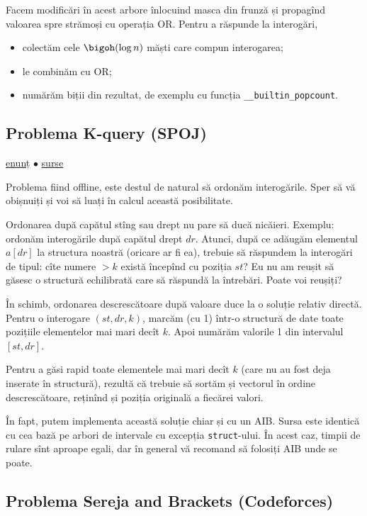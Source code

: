 Facem modificări în acest arbore înlocuind masca din frunză și propagînd valoarea spre strămoși cu operația OR. Pentru a răspunde la interogări,

\begin{itemize}
  \item colectăm cele $\bigoh(\log n)$ măști care compun interogarea;
  \item le combinăm cu OR;
  \item numărăm biții din rezultat, de exemplu cu funcția \texttt{__builtin_popcount}.
\end{itemize}

\subsection{Problema K-query (SPOJ)}
\label{problem:k-query}

\href{https://www.spoj.com/problems/KQUERY/}{enunț}
$\bullet$
\hyperref[code:k-query]{surse}

Problema fiind offline, este destul de natural să ordonăm interogările. Sper să vă obișnuiți și voi să luați în calcul această posibilitate.

Ordonarea după capătul stîng sau drept nu pare să ducă nicăieri. Exemplu: ordonăm interogările după capătul drept $dr$. Atunci, după ce adăugăm elementul $a[dr]$ la structura noastră (oricare ar fi ea), trebuie să răspundem la interogări de tipul: cîte numere $> k$ există începînd cu poziția $st$? Eu nu am reușit să găsesc o structură echilibrată care să răspundă la întrebări. Poate voi reușiți?

În schimb, ordonarea descrescătoare după valoare duce la o soluție relativ directă. Pentru o interogare $(st, dr, k)$, marcăm (cu 1) într-o structură de date toate pozițiile elementelor mai mari decît $k$. Apoi numărăm valorile 1 din intervalul $[st, dr]$.

Pentru a găsi rapid toate elementele mai mari decît $k$ (care nu au fost deja inserate în structură), rezultă că trebuie să sortăm și vectorul în ordine descrescătoare, reținînd și poziția originală a fiecărei valori.

În fapt, putem implementa această soluție chiar și cu un AIB. Sursa este identică cu cea bază pe arbori de intervale cu excepția \texttt{struct}-ului. În acest caz, timpii de rulare sînt aproape egali, dar în general vă recomand să folosiți AIB unde se poate.

\subsection{Problema Sereja and Brackets (Codeforces)}
\label{problem:sereja-and-brackets}

